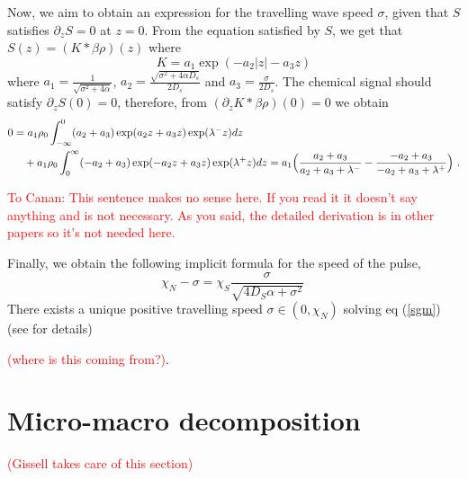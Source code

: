 \documentclass[11pt,twoside]{article}
\begin{document}
Now, we aim to obtain an expression for the travelling wave speed $\sigma$, given that $S$ satisfies $\partial_zS=0$ at $z=0$. 
From the equation satisfied by $S$, we get that $S(z)=(K*\beta\rho)(z)$ where 
\begin{displaymath}
    K=a_1\exp\left(-a_2|z|-a_3z\right)
\end{displaymath}
where $a_1=\frac{1}{\sqrt{\sigma^2+4\alpha}}$,   $a_2=\frac{\sqrt{\sigma^2+4\alpha D_s}}{2D_s}$ and $a_3=\frac{\sigma}{2D_s}$.
The chemical signal should satisfy $\partial_zS(0)=0$, therefore, from $(\partial_z K *\beta\rho)(0)=0$ we obtain
\begin{align*}
    0&=a_1\rho_0\int_{-\infty}^{0}(a_2+a_3) \exp(a_2z+a_3z)\exp(\lambda^-z)dz\\ &\quad+a_1\rho_0\int_{0}^{\infty}(-a_2+a_3)\exp(-a_2z+a_3z)\exp(\lambda^{+}z)dz
    =a_1\Bigl(\frac{a_2+a_3}{a_2+a_3+\lambda^{-}}-\frac{-a_2+a_3}{-a_2+a_3+\lambda^+}\Bigr)\ .
\end{align*}

\textcolor{red}{To Canan: This sentence makes no sense here. If you read it it doesn't say anything and is not necessary. As you said, the detailed derivation is in other papers so it's not needed here.}

Finally, we obtain the following implicit formula for the speed of the pulse,
\begin{equation}\label{sgm}
\chi_N-\sigma=\chi_S\dfrac{\sigma}{\sqrt{4D_S\alpha+\sigma^2}}\ \end{equation}
There exists a unique positive travelling speed $\sigma\in (0,\chi_N)$  solving eq (\ref{sgm}) (see \cite{saragosti2010mathematical} for details)

\textcolor{red}{(where is this coming from?)}.




\section{Micro-macro decomposition}
\textcolor{red}{(Gissell takes care of this section)}
\end{document}

